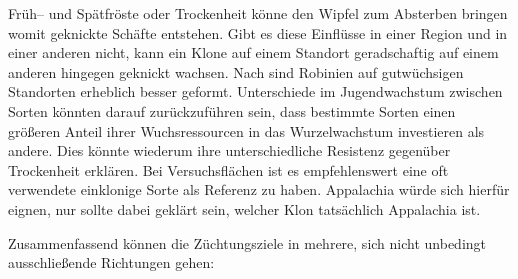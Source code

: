 \documentclass[twocolumn]{scrartcl}
\begin{document}
Früh-- und Spätfröste oder Trockenheit könne den Wipfel zum Absterben
bringen womit geknickte Schäfte entstehen. Gibt es diese Einflüsse in
einer Region und in einer anderen nicht, kann ein Klone auf einem
Standort geradschaftig auf einem anderen hingegen geknickt wachsen.
Nach \citet[S.~48]{erteld1952robinieErtrag} sind Robinien auf
gutwüchsigen Standorten erheblich besser geformt.
Unterschiede im Jugendwachstum zwischen Sorten könnten darauf
zurückzuführen sein, dass bestimmte Sorten einen größeren Anteil ihrer
Wuchsressourcen in das Wurzelwachstum investieren als andere. Dies
könnte wiederum ihre unterschiedliche Resistenz gegenüber Trockenheit
erklären.
Bei Versuchsflächen ist es empfehlenswert eine oft verwendete einklonige
Sorte als Referenz zu haben. Appalachia würde sich hierfür eignen, nur
sollte dabei geklärt sein, welcher Klon tatsächlich Appalachia ist.

Zusammenfassend können die Züchtungsziele in mehrere, sich nicht unbedingt
ausschließende Richtungen gehen:
\end{document}
